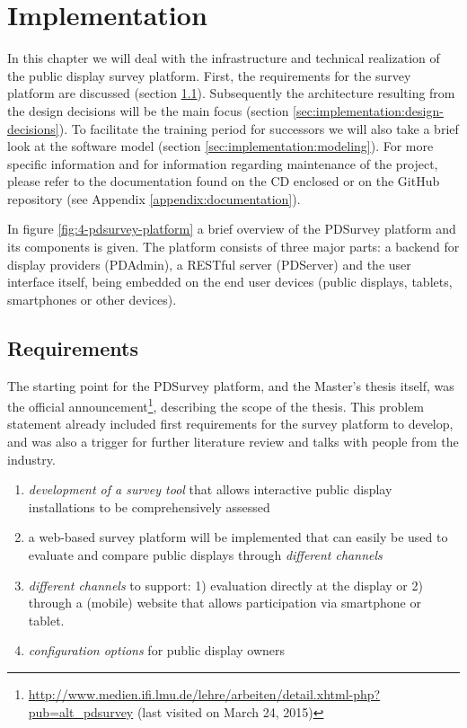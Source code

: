 \section{Implementation}
\label{chapter:implementation}
\label{sec:implementation}

	In this chapter we will deal with the infrastructure and technical realization of the public display survey platform. First, the requirements for the survey platform are discussed (section \ref{sec:implementation:requirements}). Subsequently the architecture resulting from the design decisions will be the main focus (section \ref{sec:implementation:design-decisions}). To facilitate the training period for successors we will also take a brief look at the software model (section \ref{sec:implementation:modeling}). For more specific information and for information regarding maintenance of the project, please refer to the documentation found on the CD enclosed or on the GitHub repository (see Appendix \ref{appendix:documentation}).

	In figure \ref{fig:4-pdsurvey-platform} a brief overview of the PDSurvey platform and its components is given. The platform consists of three major parts: a backend for display providers (PDAdmin), a RESTful server (PDServer) and the user interface itself, being embedded on the end user devices (public displays, tablets, smartphones or other devices). 





\subsection{Requirements}
\label{sec:implementation:requirements}

	The starting point for the PDSurvey platform, and the Master's thesis itself, was the official announcement\footnote{\url{http://www.medien.ifi.lmu.de/lehre/arbeiten/detail.xhtml-php?pub=alt_pdsurvey} (last visited on March 24, 2015)}, describing the scope of the thesis. This problem statement already included first requirements for the survey platform to develop, and was also a trigger for further literature review and talks with people from the industry.

	\begin{enumerate}[itemsep=0pt] 
	\item \textit{development of a survey tool} that allows interactive public display installations to be comprehensively assessed 
	\item a web-based survey platform will be implemented that can easily be used to evaluate and compare public displays through \textit{different channels} 
	\item \textit{different channels} to support: 1) evaluation directly at
	the display or 2) through a (mobile) website that allows participation via smartphone or tablet.
	\item \textit{configuration options} for public display owners
	\end{enumerate}

